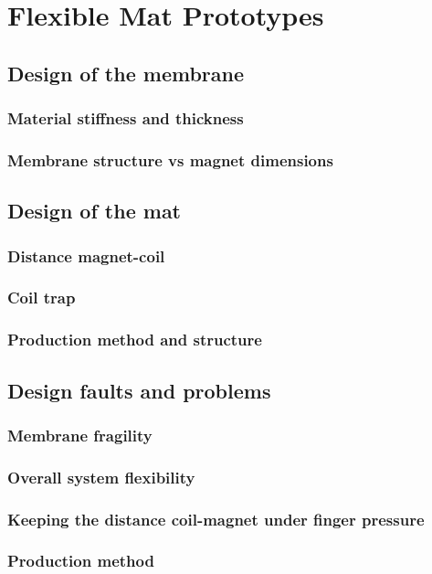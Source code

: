 \section{Flexible Mat Prototypes}

\subsection{Design of the membrane}

\subsubsection{Material stiffness and thickness}

\subsubsection{Membrane structure vs magnet dimensions}


\subsection{Design of the mat}

\subsubsection{Distance magnet-coil}

\subsubsection{Coil trap}

\subsubsection{Production method and structure}


\subsection{Design faults and problems}

\subsubsection{Membrane fragility}

\subsubsection{Overall system flexibility}

\subsubsection{Keeping the distance coil-magnet under finger pressure}

\subsubsection{Production method}